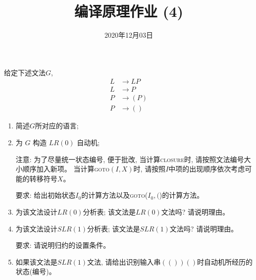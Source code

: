 \documentclass[a4paper, justified]{tufte-handout}
\title{编译原理作业 (4)}
\date{2020年12月03日}
\begin{document}
\maketitle
\noplagiarism %
\begin{abstract}
\end{abstract}
\beginrequired

\begin{problem}[\score{10 = 1 + 2 + 2 + 3 + 2}]
  给定下述文法$G$,
  \begin{align}
    L &\to LP \\[8pt]
    L &\to P \\[8pt]
    P &\to (P) \\[8pt]
    P &\to ()
  \end{align}

  \begin{enumerate}[(1)]
    \item 简述$G$所对应的语言;
    \item 为 $G$ 构造 $LR(0)$ 自动机;

      注意: 为了尽量统一状态编号, 便于批改, 当计算\textsc{closure}时, 请按照文法编号大小顺序加入新项。
      当计算\textsc{goto}$(I, X)$时, 请按照$I$中项的出现顺序依次考虑可能的转移符号$X$。

      要求: 给出初始状态$I_{0}$的计算方法以及\textsc{goto}($I_{0}, ($)的计算方法。
    \item 为该文法设计$LR(0)$分析表; 该文法是$LR(0)$文法吗? 请说明理由。
    \item 为该文法设计$SLR(1)$分析表; 该文法是$SLR(1)$文法吗? 请说明理由。

      要求: 请说明归约的设置条件。
    \item 如果该文法是$SLR(1)$文法, 请给出识别输入串$(())()$时自动机所经历的状态(编号)。
  \end{enumerate}
\end{problem}
\end{document}
